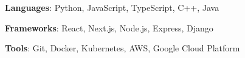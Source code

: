 \item \textbf{Languages}: Python, JavaScript, TypeScript, C++, Java
\item \textbf{Frameworks}: React, Next.js, Node.js, Express, Django
\item \textbf{Tools}: Git, Docker, Kubernetes, AWS, Google Cloud Platform
